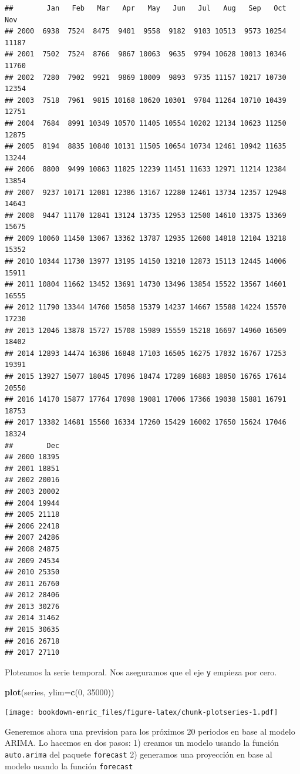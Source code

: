 \documentclass[]{book}
\newenvironment{Shaded}{\begin{snugshade}}{\end{snugshade}}
\newcommand{\KeywordTok}[1]{\textcolor[rgb]{0.13,0.29,0.53}{\textbf{{#1}}}}
\newcommand{\DataTypeTok}[1]{\textcolor[rgb]{0.13,0.29,0.53}{{#1}}}
\newcommand{\DecValTok}[1]{\textcolor[rgb]{0.00,0.00,0.81}{{#1}}}
\newcommand{\NormalTok}[1]{{#1}}
\theoremstyle{definition}
\theoremstyle{definition}
\theoremstyle{remark}
\begin{document}
\begin{verbatim}
##        Jan   Feb   Mar   Apr   May   Jun   Jul   Aug   Sep   Oct   Nov
## 2000  6938  7524  8475  9401  9558  9182  9103 10513  9573 10254 11187
## 2001  7502  7524  8766  9867 10063  9635  9794 10628 10013 10346 11760
## 2002  7280  7902  9921  9869 10009  9893  9735 11157 10217 10730 12354
## 2003  7518  7961  9815 10168 10620 10301  9784 11264 10710 10439 12751
## 2004  7684  8991 10349 10570 11405 10554 10202 12134 10623 11250 12875
## 2005  8194  8835 10840 10131 11505 10654 10734 12461 10942 11635 13244
## 2006  8800  9499 10863 11825 12239 11451 11633 12971 11214 12384 13854
## 2007  9237 10171 12081 12386 13167 12280 12461 13734 12357 12948 14643
## 2008  9447 11170 12841 13124 13735 12953 12500 14610 13375 13369 15675
## 2009 10060 11450 13067 13362 13787 12935 12600 14818 12104 13218 15352
## 2010 10344 11730 13977 13195 14150 13210 12873 15113 12445 14006 15911
## 2011 10804 11662 13452 13691 14730 13496 13854 15522 13567 14601 16555
## 2012 11790 13344 14760 15058 15379 14237 14667 15588 14224 15570 17230
## 2013 12046 13878 15727 15708 15989 15559 15218 16697 14960 16509 18402
## 2014 12893 14474 16386 16848 17103 16505 16275 17832 16767 17253 19391
## 2015 13927 15077 18045 17096 18474 17289 16883 18850 16765 17614 20550
## 2016 14170 15877 17764 17098 19081 17006 17366 19038 15881 16791 18753
## 2017 13382 14681 15560 16334 17260 15429 16002 17650 15624 17046 18324
##        Dec
## 2000 18395
## 2001 18851
## 2002 20016
## 2003 20002
## 2004 19944
## 2005 21118
## 2006 22418
## 2007 24286
## 2008 24875
## 2009 24534
## 2010 25350
## 2011 26760
## 2012 28406
## 2013 30276
## 2014 31462
## 2015 30635
## 2016 26718
## 2017 27110
\end{verbatim}

Ploteamos la serie temporal. Nos aseguramos que el eje \texttt{y}
empieza por cero.

\begin{Shaded}
\begin{Highlighting}[]
\KeywordTok{plot}\NormalTok{(series, }\DataTypeTok{ylim=}\KeywordTok{c}\NormalTok{(}\DecValTok{0}\NormalTok{, }\DecValTok{35000}\NormalTok{))}
\end{Highlighting}
\end{Shaded}

\texttt{[image: bookdown-enric\_files/figure-latex/chunk-plotseries-1.pdf]}

Generemos ahora una prevision para los próximos 20 periodos en base al
modelo ARIMA. Lo hacemos en dos pasos: 1) creamos un modelo usando la
función \texttt{auto.arima} del paquete \texttt{forecast} 2) generamos
una proyección en base al modelo usando la función \texttt{forecast}
\end{document}
